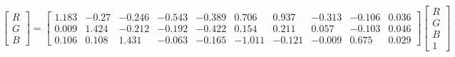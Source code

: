 \begin{equation}
\begin{bmatrix}
  R \\ G \\ B 
\end{bmatrix}=
\left[\begin{matrix}1.183 & -0.27 & -0.246 & -0.543 & -0.389 & 0.706 & 0.937 & -0.313 & -0.106 & 0.036\\ 
0.009 & 1.424 & -0.212 & -0.192 & -0.422 & 0.154 & 0.211 & 0.057 & -0.103 & 0.046\\ 
0.106 & 0.108 & 1.431 & -0.063 & -0.165 & -1.011 & -0.121 & -0.009 & 0.675 & 0.029\end{matrix}\right]
\begin{bmatrix}
  R \\ G \\ B \\ 1 
\end{bmatrix}
\end{equation}
